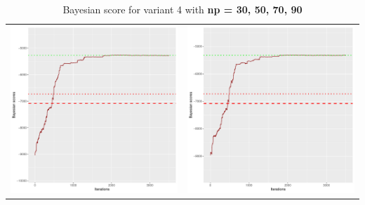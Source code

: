 \documentclass[]{scrartcl}
\begin{document}
\begin{table}[h!]
\begin{tabular}{cc}
\includegraphics[scale = 0.4]{./figs/alarm/v4/70/bayBoundsEvolution-3502.pdf} & 
\includegraphics[scale = 0.4]{./figs/alarm/v4/90/bayBoundsEvolution-3502.pdf} \\
\end{tabular}
\caption{Bayesian score for variant 4 with \textbf{np =  30, 50, 70, 90 }}
\end{table}
\end{document}
